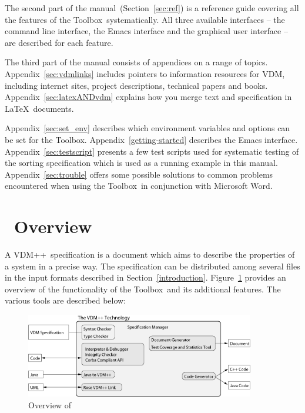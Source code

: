 \documentclass[\pformat,12pt]{article}
\newcommand{\vdmslpp}{VDM++}
\newcommand{\Toolbox}{Toolbox}
\begin{document}
The second part of the manual~(Section~\ref{sec:ref}) is a reference
guide covering all the features of the \Toolbox\ systematically. All three
available interfaces -- the command line interface, the Emacs interface
and the graphical user interface -- are described for each feature.

The third part of the manual consists of appendices on a range of
topics. 
 Appendix~\ref{sec:vdmlinks} includes
pointers to information resources for VDM, including internet sites,
project descriptions, technical papers and books.
Appendix~\ref{sec:latexANDvdm} explains how you merge text and
specification in \LaTeX\ documents.

Appendix~\ref{sec:set_env} describes which environment
variables and options can be set for the \Toolbox.
Appendix~\ref{getting-started} describes the Emacs interface.
Appendix~\ref{sec:testscript} presents a few test scripts used for
systematic testing of the sorting specification which is used as a
running example in this manual.  
Appendix~\ref{sec:trouble} offers some possible solutions 
to common problems encountered when using the \Toolbox\ in conjunction
with Microsoft Word.  


\newpage

\section{\protect\VDMTools\ Overview}\label{sec:overview}

A \vdmslpp\ specification is a document which aims to describe the
properties of a system in a precise way. The specification can be
distributed among several files in the input formats described in
Section~\ref{introduction}.  Figure~\ref{fig:toolbox} provides an
overview of the functionality of the \Toolbox\ and its additional
features. The various tools are described below:


\begin{figure}
\begin{center}
\includegraphics[width=10cm]{vdmtools_pp.png}
\caption{Overview of \protect\VDMTools}
\label{fig:toolbox}
\end{center}
\end{figure}
\end{document}
